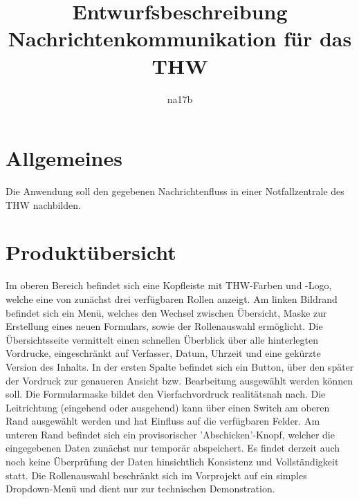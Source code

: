 \documentclass[a4paper,11pt,oneside, titlepage]{article}
\title{Entwurfsbeschreibung\\Nachrichtenkommunikation für das THW}
\author{na17b}
\date{}
\begin{document}
\maketitle


\tableofcontents


\newpage


\section{Allgemeines}
Die Anwendung soll den gegebenen Nachrichtenfluss in einer Notfallzentrale des THW nachbilden.
\section{Produktübersicht}
Im oberen Bereich befindet sich eine Kopfleiste mit THW-Farben und -Logo, welche eine von zunächst drei verfügbaren Rollen anzeigt. Am linken Bildrand befindet sich ein Menü, welches den Wechsel zwischen Übersicht, Maske zur Erstellung eines neuen Formulars, sowie der Rollenauswahl ermöglicht. Die Übersichtsseite vermittelt einen schnellen Überblick über alle hinterlegten Vordrucke, eingeschränkt auf Verfasser, Datum, Uhrzeit und eine gekürzte Version des Inhalts. In der ersten Spalte befindet sich ein Button, über den später der Vordruck zur genaueren Ansicht bzw. Bearbeitung ausgewählt werden können soll. Die Formularmaske bildet den Vierfachvordruck realitätsnah nach. Die Leitrichtung (eingehend oder ausgehend) kann über einen Switch am oberen Rand ausgewählt werden und hat Einfluss auf die verfügbaren Felder. Am unteren Rand befindet sich ein provisorischer 'Abschicken'-Knopf, welcher die eingegebenen Daten zunächst nur temporär abspeichert. Es findet derzeit auch noch keine Überprüfung der Daten hinsichtlich Konsistenz und Vollständigkeit statt. Die Rollenauswahl beschränkt sich im Vorprojekt auf ein simples Dropdown-Menü und dient nur zur technischen Demonstration.
\end{document}
